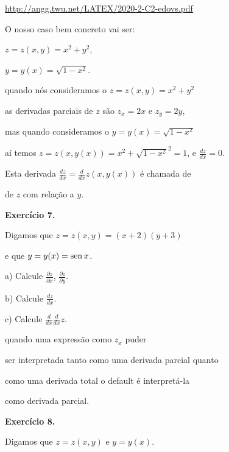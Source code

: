 \documentclass[oneside,12pt]{article}
\begin{document}
{\footnotesize

\url{http://angg.twu.net/LATEX/2020-2-C2-edovs.pdf}

}

\msk

O nosso caso bem concreto vai ser:

$z = z(x,y) = x^2 + y^2$,

$y = y(x) = \sqrt{1 - x^2}$.

quando nós  consideramos o $z = z(x,y) = x^2 + y^2$

as derivadas parciais de $z$ são $z_x = 2x$ e $z_y = 2y$,

mas quando  consideramos o $y = y(x) = \sqrt{1 - x^2}$

aí temos $z = z(x,y(x)) = x^2 + \sqrt{1-x^2}^2 = 1$, e $\frac{dz}{dx}=0$.

\msk

Esta derivada $\frac{dz}{dx} = \frac{d}{dx} z(x,y(x))$ é chamada de

 de $z$ com relação a $y$.




\newpage


{\bf Exercício 7.}

Digamos que $z = z(x,y) = (x+2)(y+3)$

e que $y = y(x) = \operatorname{sen} x$.

a) Calcule $\frac{∂z}{∂x}$, $\frac{∂z}{∂y}$.

b) Calcule $\frac{dz}{dx}$.

c) Calcule $\frac{d}{dx}\frac{d}{dx}z$.

\msk

 quando uma expressão como $z_x$ puder

ser interpretada tanto como uma derivada parcial quanto

como uma derivada total o default é interpretá-la

como derivada parcial.


\newpage


{\bf Exercício 8.}

Digamos que $z=z(x,y)$ e $y=y(x)$.
\end{document}
